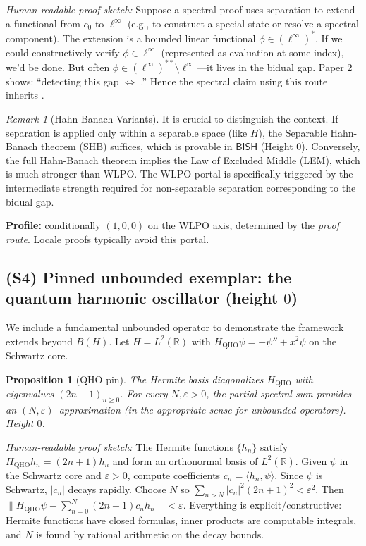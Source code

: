 \documentclass[11pt]{article}
\theoremstyle{plain}
\newtheorem{proposition}[theorem]{Proposition}
\theoremstyle{definition}
\theoremstyle{remark}
\newtheorem{remark}[theorem]{Remark}
\newenvironment{hrproof}{\noindent\textit{Human-readable proof sketch:} }{}
\newcommand{\R}{\mathbb{R}}
\newcommand{\BISH}{\mathsf{BISH}}
\newcommand{\WLPO}{\mathrm{WLPO}}
\begin{document}
\begin{hrproof}
Suppose a spectral proof uses separation to extend a functional from $c_0$ to $\ell^\infty$ (e.g., to construct a special state or resolve a spectral component). The extension is a bounded linear functional $\phi\in (\ell^\infty)^*$. If we could constructively verify $\phi\in\ell^\infty$ (represented as evaluation at some index), we'd be done. But often $\phi\in (\ell^\infty)^{**}\setminus\ell^\infty$---it lives in the bidual gap. Paper 2 shows: ``detecting this gap $\Leftrightarrow$ \WLPO.'' Hence the spectral claim using this route inherits \WLPO.
\end{hrproof}

\begin{remark}[Hahn-Banach Variants]
It is crucial to distinguish the context. If separation is applied only within a separable space (like $H$), the Separable Hahn-Banach theorem (SHB) suffices, which is provable in $\BISH$ (Height 0). Conversely, the full Hahn-Banach theorem implies the Law of Excluded Middle (LEM), which is much stronger than $\WLPO$. The WLPO portal is specifically triggered by the intermediate strength required for non-separable separation corresponding to the bidual gap.
\end{remark}

\noindent\textbf{Profile:} conditionally $(1,0,0)$ on the WLPO axis, determined by the \emph{proof route}. Locale proofs typically avoid this portal.

\subsection{(S4) Pinned unbounded exemplar: the quantum harmonic oscillator (height $0$)}
We include a fundamental unbounded operator to demonstrate the framework extends beyond $B(H)$.
Let $H=L^2(\R)$ with $H_{\mathrm{QHO}}\psi=-\psi''+x^2\psi$ on the Schwartz core.

\begin{proposition}[QHO pin]
The Hermite basis diagonalizes $H_{\mathrm{QHO}}$ with eigenvalues $(2n+1)_{n\ge 0}$. For every $N,\varepsilon>0$, the partial spectral sum provides an $(N,\varepsilon)$--approximation (in the appropriate sense for unbounded operators). Height $0$.
\end{proposition}

\begin{hrproof}
The Hermite functions $\{h_n\}$ satisfy $H_{\mathrm{QHO}} h_n = (2n+1)h_n$ and form an orthonormal basis of $L^2(\R)$. Given $\psi$ in the Schwartz core and $\varepsilon>0$, compute coefficients $c_n = \langle h_n, \psi\rangle$. Since $\psi$ is Schwartz, $|c_n|$ decays rapidly. Choose $N$ so $\sum_{n>N} |c_n|^2(2n+1)^2 < \varepsilon^2$. Then $\|H_{\mathrm{QHO}}\psi - \sum_{n=0}^N (2n+1) c_n h_n\| < \varepsilon$. Everything is explicit/constructive: Hermite functions have closed formulas, inner products are computable integrals, and $N$ is found by rational arithmetic on the decay bounds.
\end{hrproof}
\end{document}
